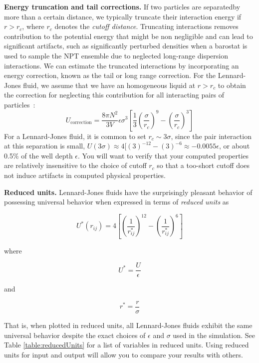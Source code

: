 \documentclass[aip,jcp,preprint,superscriptaddress,floatfix]{revtex4-1}
\begin{document}
\textbf{Energy truncation and tail corrections.} 
If two particles are separatedby more than a certain distance, we typically truncate their interaction energy if $r > r_c$, where $r_c$ denotes the \emph{cutoff distance}. 
Truncating interactions removes contribution to the potential energy that might be non negligible and can lead to significant artifacts, such as significantly perturbed densities when a barostat is used to sample the NPT ensemble due to neglected long-range dispersion interactions. 
We can estimate the truncated interactions by incorporating an energy 
correction, known as the tail or long range correction.
For the Lennard-Jones fluid, we assume that we have an homogeneous liquid at $r>r_c$ to obtain the correction for neglecting this contribution for all interacting pairs of particles~\cite{Shirts.JPCB.111.13052.2007}:
\begin{equation}
	U_\mathrm{correction} = \frac{8 \pi N^2}{3 V} \epsilon \sigma^3
	\left[\frac{1}{3} \left(\frac{\sigma}{r_c} \right)^9 
	- \left(\frac{\sigma}{r_c} \right)^3 \right]
\end{equation}
For a Lennard-Jones fluid, it is common to set $r_c \sim 3 \sigma$, since the pair interaction at this separation is small, $U(3 \sigma) \approx 4 [(3)^{-12} - (3)^{-6} \approx - 0.0055 \epsilon$, or about 0.5\% of the well depth $\epsilon$.
You will want to verify that your computed properties are relatively insensitive to the choice of cutoff $r_c$ so that a too-short cutoff does not induce artifacts in computed physical properties.

\textbf{Reduced units.}
Lennard-Jones fluids have the surprisingly pleasant behavior of possessing universal behavior when expressed in terms of \emph{reduced units} as

\begin{equation}
	U^*\left(r_{ij} \right) = 4 \left[\left(\frac{1}{r^*_{ij}}\right)^{12} -\left(\frac{1}{r^*_{ij}}\right)^{6} \right]
	\label{eq.lennardjonesReduced}
\end{equation}

where 

\begin{equation}
	U^* = \frac{U}{\epsilon}
\end{equation}

and 

\begin{equation}
	r^* = \frac{r}{\sigma}
\end{equation}

That is, when plotted in reduced units, all Lennard-Jones fluids exhibit the same universal behavior despite the exact choices of $\epsilon$ and $\sigma$ used in the simulation. See Table \ref{table:reducedUnits} for a list
of variables in reduced units.
Using reduced units for input and output will allow you to compare your results with others.
\end{document}
